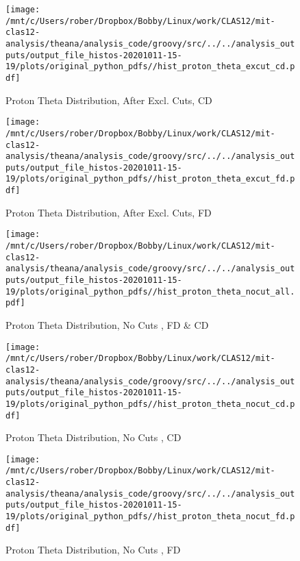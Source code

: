 \documentclass{article}
\begin{document}
\begin{landscape}
    \begin{figure}[h]
        \centering

        \texttt{[image: /mnt/c/Users/rober/Dropbox/Bobby/Linux/work/CLAS12/mit-clas12-analysis/theana/analysis\_code/groovy/src/../../analysis\_outputs/output\_file\_histos-20201011-15-19/plots/original\_python\_pdfs//hist\_proton\_theta\_excut\_cd.pdf]}
        \captionsetup{textformat=empty,labelformat=blank}
        \caption{Proton Theta Distribution, After Excl. Cuts, CD}
    \end{figure}
    \clearpage
    
    \begin{figure}[h]
        \centering

        \texttt{[image: /mnt/c/Users/rober/Dropbox/Bobby/Linux/work/CLAS12/mit-clas12-analysis/theana/analysis\_code/groovy/src/../../analysis\_outputs/output\_file\_histos-20201011-15-19/plots/original\_python\_pdfs//hist\_proton\_theta\_excut\_fd.pdf]}
        \captionsetup{textformat=empty,labelformat=blank}
        \caption{Proton Theta Distribution, After Excl. Cuts, FD}
    \end{figure}
    \clearpage
    
    \begin{figure}[h]
        \centering

        \texttt{[image: /mnt/c/Users/rober/Dropbox/Bobby/Linux/work/CLAS12/mit-clas12-analysis/theana/analysis\_code/groovy/src/../../analysis\_outputs/output\_file\_histos-20201011-15-19/plots/original\_python\_pdfs//hist\_proton\_theta\_nocut\_all.pdf]}
        \captionsetup{textformat=empty,labelformat=blank}
        \caption{Proton Theta Distribution, No Cuts , FD \& CD}
    \end{figure}
    \clearpage
    
    \begin{figure}[h]
        \centering

        \texttt{[image: /mnt/c/Users/rober/Dropbox/Bobby/Linux/work/CLAS12/mit-clas12-analysis/theana/analysis\_code/groovy/src/../../analysis\_outputs/output\_file\_histos-20201011-15-19/plots/original\_python\_pdfs//hist\_proton\_theta\_nocut\_cd.pdf]}
        \captionsetup{textformat=empty,labelformat=blank}
        \caption{Proton Theta Distribution, No Cuts , CD}
    \end{figure}
    \clearpage
    
    \begin{figure}[h]
        \centering

        \texttt{[image: /mnt/c/Users/rober/Dropbox/Bobby/Linux/work/CLAS12/mit-clas12-analysis/theana/analysis\_code/groovy/src/../../analysis\_outputs/output\_file\_histos-20201011-15-19/plots/original\_python\_pdfs//hist\_proton\_theta\_nocut\_fd.pdf]}
        \captionsetup{textformat=empty,labelformat=blank}
        \caption{Proton Theta Distribution, No Cuts , FD}
    \end{figure}
    \clearpage
    

\end{landscape}
\end{document}
